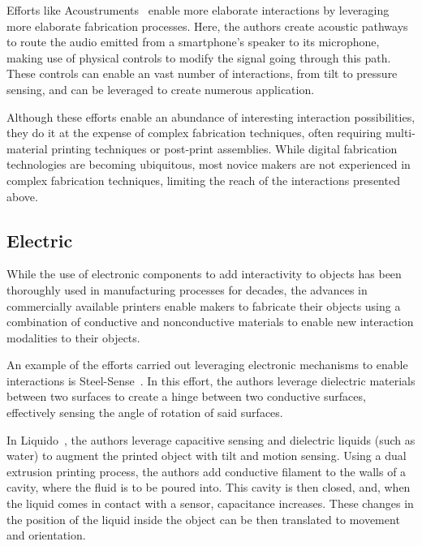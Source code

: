       Efforts like Acoustruments~\cite{Laput:2015hn} enable more elaborate
      interactions by leveraging more elaborate fabrication processes. Here,
      the authors create acoustic pathways to route the audio emitted from a
      smartphone's speaker to its microphone, making use of physical controls
      to modify the signal going through this path. These controls can enable
      an vast number of interactions, from tilt to pressure sensing, and can be
      leveraged to create numerous application.

      Although these efforts enable an abundance of interesting interaction
      possibilities, they do it at the expense of complex fabrication
      techniques, often requiring multi-material printing techniques or
      post-print assemblies. While digital fabrication technologies are
      becoming ubiquitous, most novice makers are not experienced in complex
      fabrication techniques, limiting the reach of the interactions presented
      above.

    \subsection{Electric}
      While the use of electronic components to add interactivity to objects
      has been thoroughly used in manufacturing processes for decades, the
      advances in commercially available printers enable makers to fabricate
      their objects using a combination of conductive and nonconductive
      materials to enable new interaction modalities to their objects.

      An example of the efforts carried out leveraging electronic mechanisms to
      enable interactions is Steel-Sense~\cite{Vasilevitsky:2016hy}. In this
      effort, the authors leverage dielectric materials between two surfaces to
      create a hinge between two conductive surfaces, effectively sensing the
      angle of rotation of said surfaces.

      In Liquido~\cite{Schmitz:2016cv}, the authors leverage capacitive sensing
      and dielectric liquids (such as water) to augment the printed object with
      tilt and motion sensing. Using a dual extrusion printing process, the
      authors add conductive filament to the walls of a cavity, where the fluid
      is to be poured into. This cavity is then closed, and, when the liquid
      comes in contact with a sensor, capacitance increases.  These changes in
      the position of the liquid inside the object can be then translated to
      movement and orientation.

